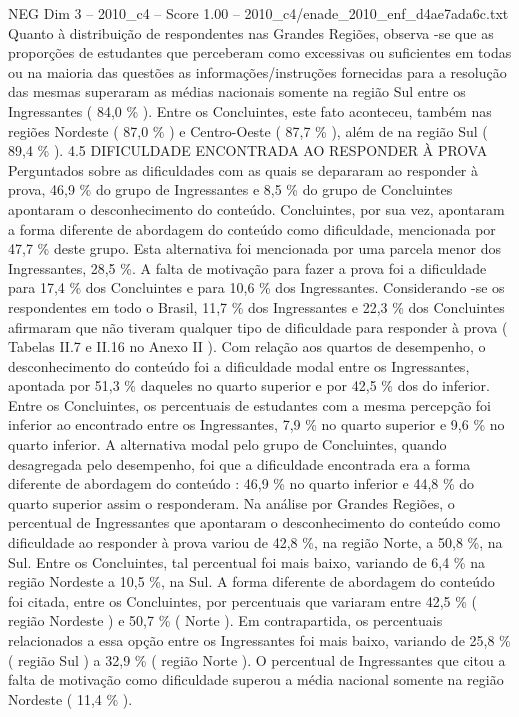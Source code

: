 \begin{textsample}{NEG Dim 3 – 2010\_c4 – Score 1.00 – 2010\_c4/enade\_2010\_enf\_d4ae7ada6c.txt}
Quanto à distribuição de respondentes nas Grandes Regiões, observa -se que as proporções de estudantes que perceberam como excessivas ou suficientes em todas ou na maioria das questões as informações/instruções fornecidas para a resolução das mesmas superaram as médias nacionais somente na região Sul entre os Ingressantes ( 84,0 \% ).
Entre os Concluintes, este fato aconteceu, também nas regiões Nordeste ( 87,0 \% ) e Centro-Oeste ( 87,7 \% ), além de na região Sul ( 89,4 \% ). 4.5 DIFICULDADE ENCONTRADA AO RESPONDER À PROVA Perguntados sobre as dificuldades com as quais se depararam ao responder à prova, 46,9 \% do grupo de Ingressantes e 8,5 \% do grupo de Concluintes apontaram o desconhecimento do conteúdo.
Concluintes, por sua vez, apontaram a forma diferente de abordagem do conteúdo como dificuldade, mencionada por 47,7 \% deste grupo.
Esta alternativa foi mencionada por uma parcela menor dos Ingressantes, 28,5 \%.
A falta de motivação para fazer a prova foi a dificuldade para 17,4 \% dos Concluintes e para 10,6 \% dos Ingressantes.
Considerando -se os respondentes em todo o Brasil, 11,7 \% dos Ingressantes e 22,3 \% dos Concluintes afirmaram que não tiveram qualquer tipo de dificuldade para responder à prova ( Tabelas II.7 e II.16 no Anexo II ).
Com relação aos quartos de desempenho, o desconhecimento do conteúdo foi a dificuldade modal entre os Ingressantes, apontada por 51,3 \% daqueles no quarto superior e por 42,5 \% dos do inferior.
Entre os Concluintes, os percentuais de estudantes com a mesma percepção foi inferior ao encontrado entre os Ingressantes, 7,9 \% no quarto superior e 9,6 \% no quarto inferior.
A alternativa modal pelo grupo de Concluintes, quando desagregada pelo desempenho, foi que a dificuldade encontrada era a forma diferente de abordagem do conteúdo : 46,9 \% no quarto inferior e 44,8 \% do quarto superior assim o responderam.
Na análise por Grandes Regiões, o percentual de Ingressantes que apontaram o desconhecimento do conteúdo como dificuldade ao responder à prova variou de 42,8 \%, na região Norte, a 50,8 \%, na Sul.
Entre os Concluintes, tal percentual foi mais baixo, variando de 6,4 \% na região Nordeste a 10,5 \%, na Sul.
A forma diferente de abordagem do conteúdo foi citada, entre os Concluintes, por percentuais que variaram entre 42,5 \% ( região Nordeste ) e 50,7 \% ( Norte ).
Em contrapartida, os percentuais relacionados a essa opção entre os Ingressantes foi mais baixo, variando de 25,8 \% ( região Sul ) a 32,9 \% ( região Norte ).
O percentual de Ingressantes que citou a falta de motivação como dificuldade superou a média nacional somente na região Nordeste ( 11,4 \% ).

\end{textsample}
